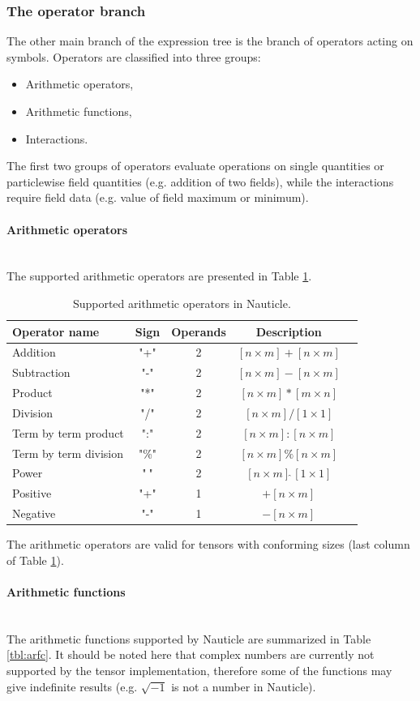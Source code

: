 \documentclass[a4paper,12pt,openany]{book}
\newcommand{\myparagraph}[1]{\paragraph{#1}\mbox{}\\\noindent}
\theoremstyle{break}
\begin{document}
\subsubsection{The operator branch}
The other main branch of the expression tree is the branch of operators acting on symbols. Operators are classified into three groups:
\begin{itemize}
  \item Arithmetic operators,
  \item Arithmetic functions,
  \item Interactions.
\end{itemize}
The first two groups of operators evaluate operations on single quantities or particlewise field quantities (e.g. addition of two fields), while the interactions require field data (e.g. value of field maximum or minimum).
\myparagraph{Arithmetic operators}
The supported arithmetic operators are presented in Table \ref{tbl:arop}.
\begin{table} [hbt!]
\begin{center}
\caption{Supported arithmetic operators in Nauticle.}\label{tbl:arop}
\begin{tabular}{ l c c c c }
\toprule[1.5pt]
\bf Operator name & \bf Sign & \bf Operands & \bf Description\\ 
\midrule
Addition & "+" & 2 & $[n \times m] + [n \times m]$\\ 
Subtraction & "-" & 2 & $[n \times m] - [n \times m]$\\ 
Product & "*" & 2 & $[n \times m] * [m \times n]$\\ 
Division & "/" & 2 & $[n \times m] / [1 \times 1]$\\ 
Term by term product & ":" & 2 & $[n \times m] : [n \times m]$\\ 
Term by term division & "\%" & 2 & $[n \times m] \% [n \times m]$\\ 
Power & "$\hat{\ }$" & 2 & $[n \times m] \hat{\ } [1 \times 1]$\\ 
Positive & "+" & 1 & $+[n \times m]$\\ 
Negative & "-" & 1 & $-[n \times m]$\\ 
\bottomrule[1.25pt]
\end{tabular}
\end{center}
\end{table}
The arithmetic operators are valid for tensors with conforming sizes (last column of Table \ref{tbl:arop}).
\myparagraph{Arithmetic functions} \label{sec:functions}
The arithmetic functions supported by Nauticle are summarized in Table \ref{tbl:arfc}. It should be noted here that complex numbers are currently not supported by the tensor implementation, therefore some of the functions may give indefinite results (e.g. $\sqrt{-1}$ is not a number in Nauticle).
\end{document}
